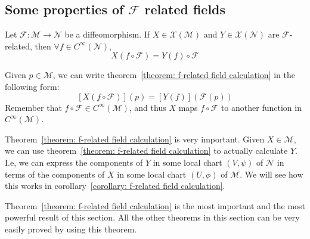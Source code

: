     \subsection{Some properties of $\mathcal{F}$ related fields}
      \begin{theorem}
        \label{theorem: f-related field calculation}
        Let $\mathcal{F}: \mathcal{M} \rightarrow \mathcal{N}$ be a
        diffeomorphism. If $X\in \mathcal{X}(\mathcal{M})$ and $Y\in
        \mathcal{X}(\mathcal{N})$ are $\mathcal{F}$-related, then
        $\forall f\in C^\infty(\mathcal{N})$, \[X\left(f \circ
        \mathcal{F}\right) = Y(f) \circ \mathcal{F}\]
      \end{theorem}
      \begin{remark}
        Given $p \in \mathcal{M}$, we can write theorem~\ref{theorem: f-related field calculation} in the following form:
        \[[X\left( f\circ \mathcal{F} \right)](p)= [Y(f)]\left(\mathcal{F}(p)\right)\]
        Remember that $f\circ \mathcal{F} \in C^\infty(\mathcal{M})$,
        and thus $X$ maps $f\circ \mathcal{F}$ to another function in $C^\infty(\mathcal{M})$.
      \end{remark}
      \begin{remark}
        Theorem~\ref{theorem: f-related field calculation} is very
        important. Given $X \in \mathcal{M}$, we can use
        theorem~\ref{theorem: f-related field calculation} to actually
        calculate $Y$. I.e, we can express the components of $Y$ in
        some local chart $(V,\psi)$ of $\mathcal{N}$ in terms of the
        components of $X$ in some local chart $(U,\phi)$ of
        $\mathcal{M}$. We will see how this works in
        corollary~\ref{corollary: f-related field calculation}.
      \end{remark}
      \begin{remark}
        Theorem~\ref{theorem: f-related field calculation} is the most important and the most powerful result of this section. All the other theorems in this section can be very easily proved by using this theorem.
      \end{remark}
